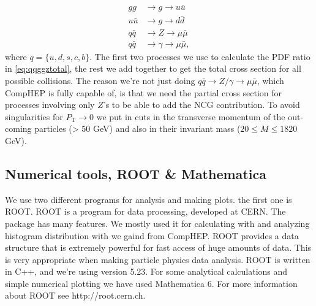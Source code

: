 \begin{align}
gg &\rightarrow g \rightarrow u \bar u \nonumber \\ \nonumber
u \bar u &\rightarrow g \rightarrow d \bar d \\ \nonumber
q \bar q &\rightarrow Z \rightarrow \mu \bar \mu \\ \nonumber
q \bar q &\rightarrow \gamma \rightarrow \mu \bar \mu,
\end{align}
where $q = \{u,d,s,c,b\}$. The first two processes we use to calculate the PDF ratio in \eqref{eq:qqggztotal}, the rest we add together to get the total cross section for all possible collisions. The reason we're not just doing $q \bar q \rightarrow Z/ \gamma \rightarrow \mu \bar \mu$, which CompHEP is fully capable of, is that we need the partial cross section for processes involving only $Z$'s to be able to add the NCG contribution. To avoid singularities for $P_\textrm{T} \rightarrow 0$ we put in cuts in the transverse momentum of the out-coming particles (> 50 GeV) and also in their invariant mass ($20 \leq M \leq 1820$ GeV).

\subsection{Numerical tools, ROOT \& Mathematica}
We use two different programs for analysis and making plots. the first one is ROOT. ROOT is a program for data processing, developed at CERN. The package has many features. We mostly used it for calculating with and analyzing histogram distribution with we gaind from CompHEP. ROOT provides a data structure that is extremely powerful for fast access of huge amounts of data. This is very appropriate when making particle physics data analysis. ROOT is written in C++, and we're using version 5.23. For some analytical calculations and simple numerical plotting we have used Mathematica 6. For more information about ROOT see http://root.cern.ch.
